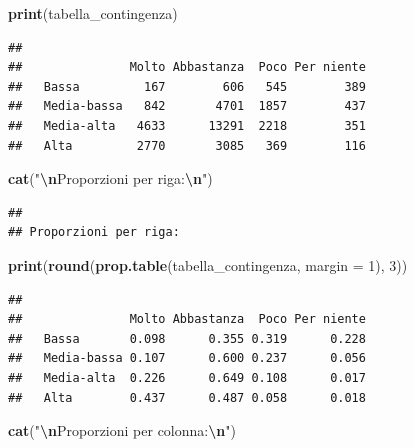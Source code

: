 \documentclass[
]{article}
\newenvironment{Shaded}{\begin{snugshade}}{\end{snugshade}}
\newcommand{\AttributeTok}[1]{\textcolor[rgb]{0.13,0.29,0.53}{#1}}
\newcommand{\DecValTok}[1]{\textcolor[rgb]{0.00,0.00,0.81}{#1}}
\newcommand{\FunctionTok}[1]{\textcolor[rgb]{0.13,0.29,0.53}{\textbf{#1}}}
\newcommand{\NormalTok}[1]{#1}
\newcommand{\SpecialCharTok}[1]{\textcolor[rgb]{0.81,0.36,0.00}{\textbf{#1}}}
\newcommand{\StringTok}[1]{\textcolor[rgb]{0.31,0.60,0.02}{#1}}
\begin{document}
\begin{Shaded}
\begin{Highlighting}[]
\FunctionTok{print}\NormalTok{(tabella\_contingenza)}
\end{Highlighting}
\end{Shaded}

\begin{verbatim}
##              
##               Molto Abbastanza  Poco Per niente
##   Bassa         167        606   545        389
##   Media-bassa   842       4701  1857        437
##   Media-alta   4633      13291  2218        351
##   Alta         2770       3085   369        116
\end{verbatim}

\begin{Shaded}
\begin{Highlighting}[]
\FunctionTok{cat}\NormalTok{(}\StringTok{"}\SpecialCharTok{\textbackslash{}n}\StringTok{Proporzioni per riga:}\SpecialCharTok{\textbackslash{}n}\StringTok{"}\NormalTok{)}
\end{Highlighting}
\end{Shaded}

\begin{verbatim}
## 
## Proporzioni per riga:
\end{verbatim}

\begin{Shaded}
\begin{Highlighting}[]
\FunctionTok{print}\NormalTok{(}\FunctionTok{round}\NormalTok{(}\FunctionTok{prop.table}\NormalTok{(tabella\_contingenza, }\AttributeTok{margin =} \DecValTok{1}\NormalTok{), }\DecValTok{3}\NormalTok{))}
\end{Highlighting}
\end{Shaded}

\begin{verbatim}
##              
##               Molto Abbastanza  Poco Per niente
##   Bassa       0.098      0.355 0.319      0.228
##   Media-bassa 0.107      0.600 0.237      0.056
##   Media-alta  0.226      0.649 0.108      0.017
##   Alta        0.437      0.487 0.058      0.018
\end{verbatim}

\begin{Shaded}
\begin{Highlighting}[]
\FunctionTok{cat}\NormalTok{(}\StringTok{"}\SpecialCharTok{\textbackslash{}n}\StringTok{Proporzioni per colonna:}\SpecialCharTok{\textbackslash{}n}\StringTok{"}\NormalTok{)}
\end{Highlighting}
\end{Shaded}
\end{document}
